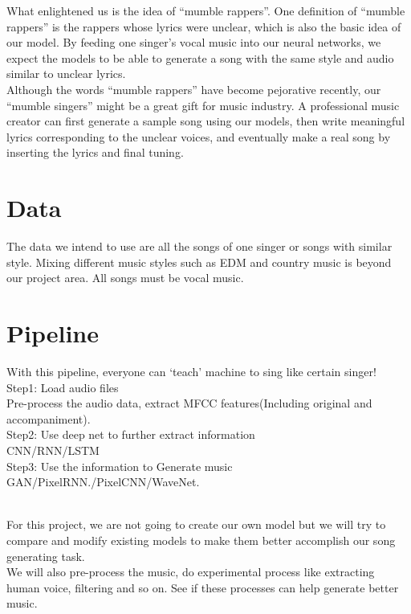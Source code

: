 \documentclass[twoside,11pt]{article}
\begin{document}
What enlightened us is the idea of “mumble rappers”. One definition of “mumble rappers” is the rappers whose lyrics were unclear, which is also the basic idea of our model. By feeding one singer’s vocal music into our neural networks, we expect the models to be able to generate a song with the same style and audio similar to unclear lyrics.\\ 

Although the words “mumble rappers” have become pejorative recently, our “mumble singers” might be a great gift for music industry. A professional music creator can first generate a sample song using our models, then write meaningful lyrics corresponding to the unclear voices, and eventually make a real song by inserting the lyrics and final tuning. \\
\section{Data} 
The data we intend to use are all the songs of one singer or songs with similar style. Mixing different music styles such as EDM and country music is beyond our project area. All songs must be vocal music.

\section{Pipeline} 
With this pipeline, everyone can ‘teach’ machine to sing like certain singer!\\
Step1: Load audio files\\
Pre-process the audio data, extract MFCC features(Including original and accompaniment).\\
Step2: Use deep net to further extract information\\
CNN/RNN/LSTM\\
Step3: Use the information to Generate music\\
GAN\citep{cite6}/PixelRNN\citep{cite5}./PixelCNN/WaveNet\citep{cite7}.\\\

For this project, we are not going to create our own model but we will try to compare and modify existing models to make them better accomplish our song generating task.\\

We will also pre-process the music, do experimental process like extracting human voice, filtering and so on. See if these processes can help generate better music.\\
\end{document}

